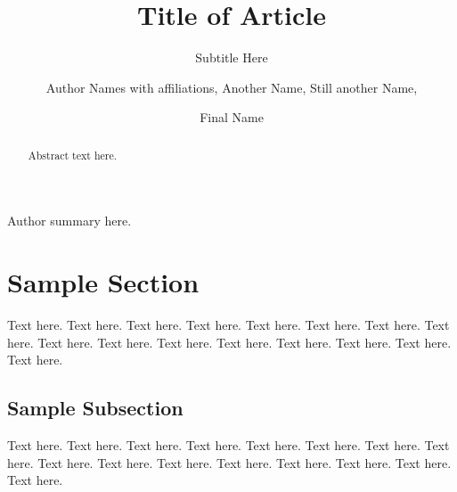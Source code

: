 \documentclass[NETN,manuscript]{stjour-new}
\begin{document}
\title[Shortened Version of Title]{Title of Article}
\subtitle{Subtitle Here}



\author[Author Names]
{Author Names with affiliations,
Another Name, Still another Name,\\
\and Final Name}









\begin{abstract}
Abstract text here.
\end{abstract}

\begin{authorsummary}
Author summary here. 
\end{authorsummary}


\section{Sample Section}
Text here. Text here. Text here. Text here.
Text here. Text here. Text here. Text here.
Text here. Text here. Text here. Text here.
Text here. Text here. Text here. Text here.

\subsection{Sample Subsection}
Text here. Text here. Text here. Text here.
Text here. Text here. Text here. Text here.
Text here. Text here. Text here. Text here.
Text here. Text here. Text here. Text here.
\end{document}
